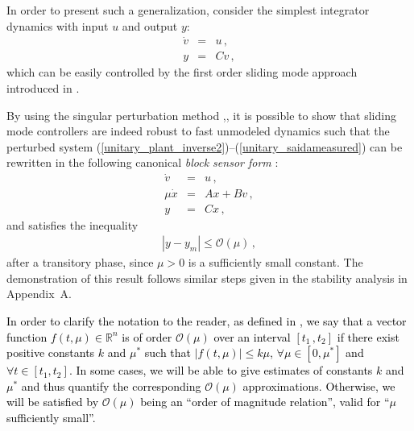 \documentclass[review]{elsarticle}
\begin{document}
In order to present such a generalization, consider the simplest integrator dynamics with input $u$ and output $y$:
%
\begin{eqnarray}
  \dot v &=& u\,,   \label{unitary_plant_inverse2}\\
  y&=& Cv\,,    \label{unitary_saidameasured}
\end{eqnarray}
%
which can be easily controlled by the first order sliding mode approach introduced  in \cite{UGS:99}.



By using the singular perturbation method \cite{K:2002},\cite{KKO:1986}, \cite{U:92} it is possible to show that sliding mode controllers are indeed robust to fast unmodeled dynamics such that the perturbed system (\ref{unitary_plant_inverse2})--(\ref{unitary_saidameasured}) can be  rewritten in the following canonical \textit{block sensor form}
\cite[p.50]{KKO:1986}:
%
\begin{eqnarray}
    \dot v &=& u \,,                               \label{fast_eq0}\\
    \mu\dot{x}&=& Ax+Bv \,,                        \label{fast_eq1}  \\
    y &=& C x \,,                            \label{fast_outupunmeasured}
\end{eqnarray}
%
and satisfies the inequality
\begin{eqnarray}
    |y-y_m| \leq \mathcal{O}(\mu)\,,    \label{residual_set}
\end{eqnarray}
%
after a transitory phase, since $\mu>0$ is a sufficiently small constant. The demonstration of this result follows similar steps given in the stability analysis in Appendix~A.  


\textcolor{black}{In order to clarify the notation to the reader, as defined in \cite{KKO:1986}, we say that a vector function $f(t,\mu) \in \mathbb{R}^n$ is of order $\mathcal{O}(\mu)$ over an interval $[t_1\,, t_2]$ if there exist positive constants $k$ and $\mu^*$ such that $|f(t,\mu)| \leq k \mu$,  $\forall \mu \in [0,\mu^*]$ and $\forall t \in [t_1,t_2]$. In some cases, we will be able to give estimates of constants $k$ and $\mu^*$ and thus quantify the corresponding $\mathcal{O}(\mu)$ approximations. Otherwise, we will be satisfied by $\mathcal{O}(\mu)$ being an ``order of magnitude relation'', valid for ``$\mu$ sufficiently small''.}
\end{document}
